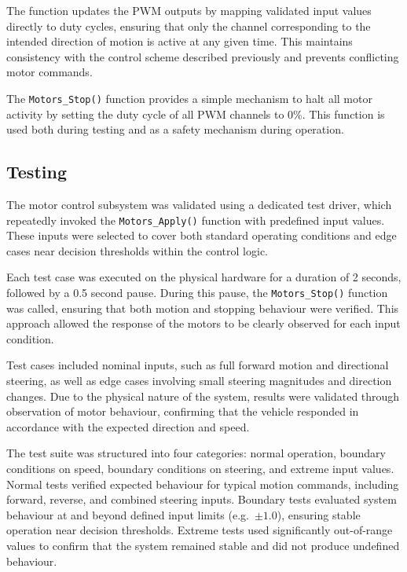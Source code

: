 The function updates the PWM outputs by mapping validated input values directly to duty cycles, ensuring that only the channel corresponding to the intended direction of motion is active at any given time. This maintains consistency with the control scheme described previously and prevents conflicting motor commands.

The \texttt{Motors\_Stop()} function provides a simple mechanism to halt all motor activity by setting the duty cycle of all PWM channels to 0\%. This function is used both during testing and as a safety mechanism during operation.

\subsection{Testing}

The motor control subsystem was validated using a dedicated test driver, which repeatedly invoked the \texttt{Motors\_Apply()} function with predefined input values. These inputs were selected to cover both standard operating conditions and edge cases near decision thresholds within the control logic.

Each test case was executed on the physical hardware for a duration of 2 seconds, followed by a 0.5 second pause. During this pause, the \texttt{Motors\_Stop()} function was called, ensuring that both motion and stopping behaviour were verified. This approach allowed the response of the motors to be clearly observed for each input condition.

Test cases included nominal inputs, such as full forward motion and directional steering, as well as edge cases involving small steering magnitudes and direction changes. Due to the physical nature of the system, results were validated through observation of motor behaviour, confirming that the vehicle responded in accordance with the expected direction and speed.

The test suite was structured into four categories: normal operation, boundary conditions on speed, boundary conditions on steering, and extreme input values. Normal tests verified expected behaviour for typical motion commands, including forward, reverse, and combined steering inputs. Boundary tests evaluated system behaviour at and beyond defined input limits (e.g.\ $\pm1.0$), ensuring stable operation near decision thresholds. Extreme tests used significantly out-of-range values to confirm that the system remained stable and did not produce undefined behaviour.

